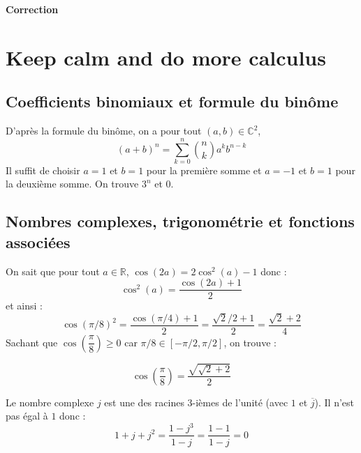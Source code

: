 \documentclass[a4paper,twoside,french,11pt]{VcCours}
\begin{document}

\begin{center}
  \large\bf
  Correction
  \end{center}
\separationTitre

\section{Keep calm and do more calculus}

\subsection{Coefficients binomiaux et formule du binôme}

%
%
%

\begin{Exercice}{}\end{Exercice}D'après la formule du binôme, on a pour tout $(a,b) \in \mathbb{C}^2$,
$$ (a+b)^n = \sum_{k=0}^n \binom{n}{k} a^k b^{n-k}$$
Il suffit de choisir $a=1$ et $b=1$ pour la première somme et $a=-1$ et $b=1$ pour la deuxième somme. On trouve $3^n$ et $0$.


\subsection{Nombres complexes, trigonométrie et fonctions associées}

%
% 

\begin{Exercice}{}\end{Exercice}On sait que pour tout $a \in \mathbb{R}$, $\cos(2a)= 2 \cos^2(a)-1$ donc :
$$ \cos^2(a) = \dfrac{\cos(2a)+1}{2}$$
et ainsi :
$$ \cos(\pi/8)^2 = \dfrac{\cos(\pi/4)+1}{2} = \dfrac{\sqrt{2}/2+1}{2} = \dfrac{\sqrt{2}+2}{4}$$
Sachant que $\cos \left( \dfrac{\pi}{8} \right) \geq 0$ car $ \pi/8 \in [- \pi/2,  \pi/2]$, on trouve :

$$\cos \left(\dfrac{\pi}{8}\right) = \dfrac{\sqrt{\sqrt{2}+2}}{2} $$




\begin{Exercice}{}\end{Exercice}Le nombre complexe $j$ est une des racines $3$-ièmes de l'unité (avec $1$ et $\overline{j}$). Il n'est pas égal à $1$ donc :
$$ 1+j+j^2= \dfrac{1-j^3}{1-j}= \dfrac{1-1}{1-j}=0$$
\end{document}
